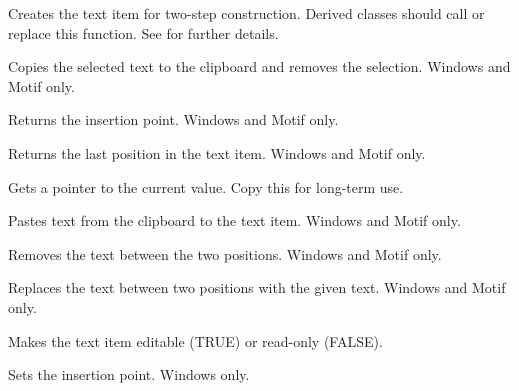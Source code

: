 Creates the text item for two-step construction. Derived classes
should call or replace this function. See 
for further details.



Copies the selected text to the clipboard and removes the selection. Windows and Motif only.



Returns the insertion point. Windows and Motif only.



Returns the last position in the text item. Windows and Motif only.



Gets a pointer to the current value. Copy this for long-term use.



Pastes text from the clipboard to the text item. Windows and Motif only.



Removes the text between the two positions. Windows and Motif only.



Replaces the text between two positions with the given text. Windows and Motif only.



Makes the text item editable (TRUE) or read-only (FALSE).



Sets the insertion point. Windows only.

